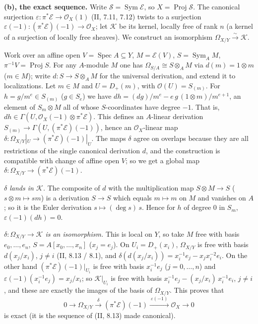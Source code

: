 \documentclass[11pt]{article}
\begin{document}
\textbf{(b), the exact sequence.} Write $\mathcal S=\operatorname{Sym}\mathcal E$, so $X=\operatorname{Proj}\mathcal S$. The canonical surjection $\varepsilon:\pi^*\mathcal E\to\mathcal O_X(1)$ (II, 7.11, 7.12) twists to a surjection $\varepsilon(-1):(\pi^*\mathcal E)(-1)\to\mathcal O_X$; let $\mathcal K$ be its kernel, locally free of rank $n$ (a kernel of a surjection of locally free sheaves). We construct an isomorphism $\Omega_{X/Y}\xrightarrow{\sim}\mathcal K$.

Work over an affine open $V=\operatorname{Spec}A\subseteq Y$, $M=\mathcal E(V)$, $S=\operatorname{Sym}_A M$, $\pi^{-1}V=\operatorname{Proj}S$. For any $A$-module $M$ one has $\Omega_{S/A}\cong S\otimes_AM$ via $d(m)=1\otimes m$ ($m\in M$); write $d:S\to S\otimes_AM$ for the universal derivation, and extend it to localizations. Let $m\in M$ and $U=D_+(m)$, with $\mathcal O(U)=S_{(m)}$. For $h=g/m^e\in S_{(m)}$ ($g\in S_e$) we have $dh=(dg)/m^e-e\,g\,(1\otimes m)/m^{e+1}$, an element of $S_m\otimes M$ all of whose $S$-coordinates have degree $-1$. That is, $dh\in\Gamma(U,\mathcal O_X(-1)\otimes\pi^*\mathcal E)$. This defines an $A$-linear derivation $S_{(m)}\to\Gamma(U,(\pi^*\mathcal E)(-1))$, hence an $\mathcal O_X$-linear map $\delta:\Omega_{X/Y}|_U\to(\pi^*\mathcal E)(-1)|_U$. The maps $\delta$ agree on overlaps because they are all restrictions of the single canonical derivation $d$, and the construction is compatible with change of affine open $V$; so we get a global map $\delta:\Omega_{X/Y}\to(\pi^*\mathcal E)(-1)$.

\emph{$\delta$ lands in $\mathcal K$.} The composite of $d$ with the multiplication map $S\otimes M\to S$ ($s\otimes m\mapsto sm$) is a derivation $S\to S$ which equals $m\mapsto m$ on $M$ and vanishes on $A$; so it is the Euler derivation $s\mapsto(\deg s)\,s$. Hence for $h$ of degree $0$ in $S_m$, $\varepsilon(-1)(dh)=0$.

\emph{$\delta:\Omega_{X/Y}\to\mathcal K$ is an isomorphism.} This is local on $Y$, so take $M$ free with basis $e_0,\dots,e_n$, $S=A[x_0,\dots,x_n]$ ($x_j=e_j$). On $U_i=D_+(x_i)$, $\Omega_{X/Y}$ is free with basis $d(x_j/x_i)$, $j\ne i$ (II, 8.13 / 8.1), and $\delta(d(x_j/x_i))=x_i^{-1}e_j-x_jx_i^{-2}e_i$. On the other hand $(\pi^*\mathcal E)(-1)|_{U_i}$ is free with basis $x_i^{-1}e_j$ ($j=0,\dots,n$) and $\varepsilon(-1)(x_i^{-1}e_j)=x_j/x_i$; so $\mathcal K|_{U_i}$ is free with basis $x_i^{-1}e_j-(x_j/x_i)\,x_i^{-1}e_i$, $j\ne i$, and these are exactly the images of the basis of $\Omega_{X/Y}$. This proves that
\[
0\to\Omega_{X/Y}\xrightarrow{\ \delta\ }(\pi^*\mathcal E)(-1)\xrightarrow{\ \varepsilon(-1)\ }\mathcal O_X\to0
\]
is exact (it is the sequence of (II, 8.13) made canonical).
\end{document}
